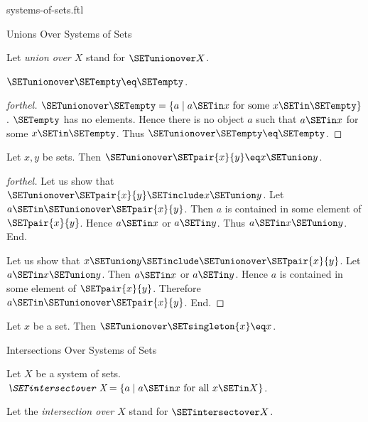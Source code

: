 \documentclass{stex}
\begin{document}
\begin{smodule}{systems-of-sets.ftl}
\begin{sfragment}{Unions Over Systems of Sets}
\begin{definition}[forthel,id=FOUNDATIONS_10_541772562300928]
    Let \emph{union over $X$} stand for $\SETunionover X$.
  \end{definition}

  \begin{proposition}[forthel,id=FOUNDATIONS_10_4872701241982976]
    $\SETunionover \SETempty \eq \SETempty$.
  \end{proposition}
  \begin{proof}[forthel]
    $\SETunionover \SETempty = \{ a \mid a \SETin x\text{ for some }x \SETin \SETempty \}$.
    $\SETempty$ has no elements.
    Hence there is no object $a$ such that $a \SETin x$ for some $x \SETin \SETempty$.
    Thus $\SETunionover \SETempty \eq \SETempty$.
  \end{proof}

  \begin{proposition}[forthel,id=FOUNDATIONS_10_2559541585641472]
    Let $x, y$ be sets.
    Then $\SETunionover \SETpair{x}{y} \eq x \SETunion y$.
  \end{proposition}
  \begin{proof}[forthel]
    Let us show that $\SETunionover \SETpair{x}{y} \SETinclude x \SETunion y$.
      Let $a \SETin \SETunionover \SETpair{x}{y}$.
      Then $a$ is contained in some element of $\SETpair{x}{y}$.
      Hence $a \SETin x$ or $a \SETin y$.
      Thus $a \SETin x \SETunion y$.
    End.

    Let us show that $x \SETunion y \SETinclude \SETunionover \SETpair{x}{y}$.
      Let $a \SETin x \SETunion y$.
      Then $a \SETin x$ or $a \SETin y$.
      Hence $a$ is contained in some element of $\SETpair{x}{y}$.
      Therefore $a \SETin \SETunionover \SETpair{x}{y}$.
    End.
  \end{proof}

  \begin{corollary}[forthel,id=FOUNDATIONS_10_2157223832715264]
    Let $x$ be a set.
    Then $\SETunionover \SETsingleton{x} \eq x$.
  \end{corollary}
\end{sfragment}

\begin{sfragment}{Intersections Over Systems of Sets}
  \begin{definition}[forthel,id=FOUNDATIONS_10_2659345095458816]
    Let $X$ be a system of sets.
    $\emph{\SETintersectover X} = \{ a \mid a \SETin x\text{ for all }x \SETin X \}$.

    Let the \emph{intersection over $X$} stand for $\SETintersectover X$.
  \end{definition}


\end{sfragment}
\end{smodule}
\end{document}
